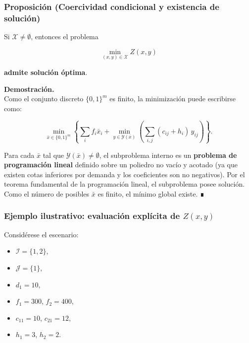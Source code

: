 \documentclass[
  spanish,
  us-letterpaper,
]{scrreprt}
\providecommand{\tightlist}{%
  \setlength{\itemsep}{0pt}\setlength{\parskip}{0pt}}
\numberwithin{equation}{section}
\begin{document}
\subsubsection{\texorpdfstring{\textbf{Proposición (Coercividad
condicional y existencia de
solución)}}{Proposición (Coercividad condicional y existencia de solución)}}\label{proposiciuxf3n-coercividad-condicional-y-existencia-de-soluciuxf3n}

Si \(\mathcal{X} \ne \emptyset\), entonces el problema

\[
\min_{(x, y) \in \mathcal{X}} Z(x, y)
\]

\textbf{admite solución óptima}.

\textbf{Demostración.}\\
Como el conjunto discreto \(\{0,1\}^m\) es finito, la minimización puede
escribirse como:

\[
\min_{\bar{x} \in \{0,1\}^m}
\left\{
\sum_i f_i \bar{x}_i
+
\min_{y \in \mathcal{Y}(\bar{x})}
\left(
\sum_{i,j} (c_{ij} + h_i)\, y_{ij}
\right)
\right\}.
\]

Para cada \(\bar{x}\) tal que \(\mathcal{Y}(\bar{x}) \ne \emptyset\), el
subproblema interno es un \textbf{problema de programación lineal}
definido sobre un poliedro no vacío y acotado (ya que existen cotas
inferiores por demanda y los coeficientes son no negativos). Por el
teorema fundamental de la programación lineal, el subproblema posee
solución. Como el número de posibles \(\bar{x}\) es finito, el mínimo
global existe. ∎

\subsubsection{\texorpdfstring{\textbf{Ejemplo ilustrativo: evaluación
explícita de
\(Z(x, y)\)}}{Ejemplo ilustrativo: evaluación explícita de Z(x, y)}}\label{ejemplo-ilustrativo-evaluaciuxf3n-expluxedcita-de-zx-y}

Considérese el escenario:

\begin{itemize}
\tightlist
\item
  \(\mathcal{I} = \{1,2\}\),\\
\item
  \(\mathcal{J} = \{1\}\),\\
\item
  \(d_1 = 10\),\\
\item
  \(f_1 = 300\), \(f_2 = 400\),\\
\item
  \(c_{11} = 10\), \(c_{21} = 12\),\\
\item
  \(h_1 = 3\), \(h_2 = 2\).
\end{itemize}
\end{document}
